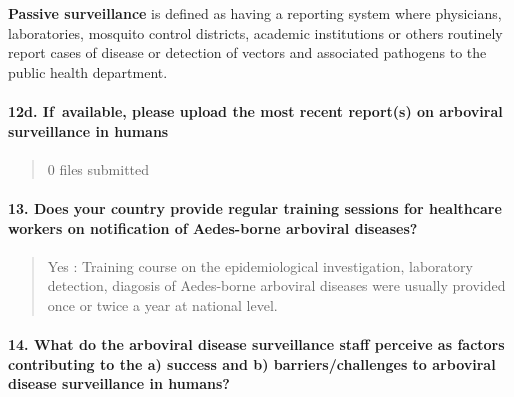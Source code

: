 \documentclass[
]{article}
\begin{document}
\textbf{Passive surveillance} is defined as having a reporting system
where physicians, laboratories, mosquito control districts, academic
institutions or others routinely report cases of disease or detection of
vectors and associated pathogens to the public health department.

\hypertarget{d.-if-available-please-upload-the-most-recent-reports-on-arboviral-surveillance-in-humans}{%
\paragraph{12d. If~available, please upload the most recent report(s) on
arboviral surveillance in
humans}\label{d.-if-available-please-upload-the-most-recent-reports-on-arboviral-surveillance-in-humans}}

\begin{quote}
0 files submitted
\end{quote}

\hypertarget{does-your-country-provide-regular-training-sessions-for-healthcare-workers-on-notification-of-aedes-borne-arboviral-diseases}{%
\paragraph{13. Does your country provide regular training sessions for
healthcare workers on notification of Aedes-borne arboviral
diseases?}\label{does-your-country-provide-regular-training-sessions-for-healthcare-workers-on-notification-of-aedes-borne-arboviral-diseases}}

\begin{quote}
Yes : Training course on the epidemiological investigation, laboratory
detection, diagosis of Aedes-borne arboviral diseases were usually
provided once or twice a year at national level.
\end{quote}

\hypertarget{what-do-the-arboviral-disease-surveillance-staff-perceive-as-factors-contributing-to-the-a-success-and-b-barrierschallenges-to-arboviral-disease-surveillance-in-humans}{%
\paragraph{14. What do the arboviral disease surveillance staff perceive
as factors contributing to the a) success and b) barriers/challenges to
arboviral disease surveillance in
humans?}\label{what-do-the-arboviral-disease-surveillance-staff-perceive-as-factors-contributing-to-the-a-success-and-b-barrierschallenges-to-arboviral-disease-surveillance-in-humans}}
\end{document}

